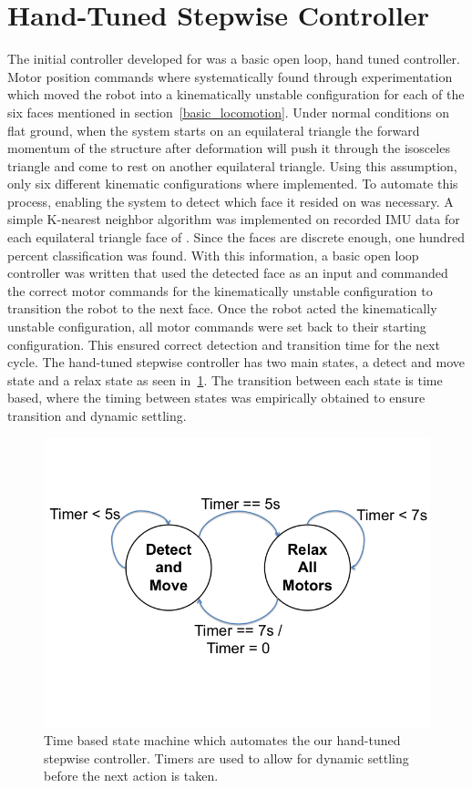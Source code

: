 \section{Hand-Tuned Stepwise Controller}
The initial controller developed for \SB{} was a basic open loop, hand tuned controller.
Motor position commands where systematically found through experimentation which moved the robot into a kinematically unstable configuration for each of the six faces mentioned in section~\ref{basic_locomotion}.
Under normal conditions on flat ground, when the system starts on an equilateral triangle the forward momentum of the structure after deformation will push it through the isosceles triangle and come to rest on another equilateral triangle.
Using this assumption, only six different kinematic configurations where implemented.
To automate this process, enabling the system to detect which face it resided on was necessary.
A simple K-nearest neighbor algorithm was implemented on recorded IMU data for each equilateral triangle face of \SB{}.
Since the faces are discrete enough, one hundred percent classification was found.
With this information, a basic open loop controller was written that used the detected face as an input and commanded the correct motor commands for the kinematically unstable configuration to transition the robot to the next face.
Once the robot acted the kinematically unstable configuration, all motor commands were set back to their starting configuration.
This ensured correct detection and transition time for the next cycle.
The hand-tuned stepwise controller has two main states, a detect and move state and a relax state as seen in~\ref{fig:stepwise_fsm}.
The transition between each state is time based, where the timing between states was empirically obtained to ensure transition and dynamic settling.

\label{hand_stepwise}
\begin{figure}[thpb]
      \centering
      \includegraphics[width=0.7\columnwidth]{tex/img/Stepwise_state_machine/Slide1}
      \caption{Time based state machine which automates the our hand-tuned stepwise controller. Timers are used to allow for dynamic settling before the next action is taken.}
      \label{fig:stepwise_fsm}
\end{figure}


